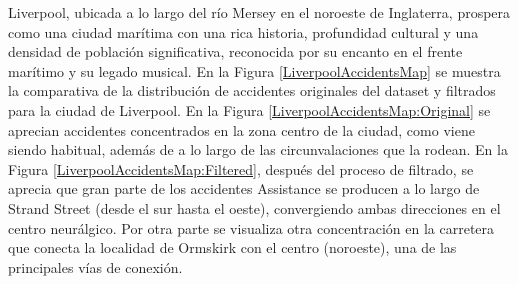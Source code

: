 \documentclass{uathesis-es}
\begin{document}
Liverpool, ubicada a lo largo del río Mersey en el noroeste de Inglaterra, prospera como una ciudad marítima con una rica historia, profundidad cultural y una densidad de población significativa, reconocida por su encanto en el frente marítimo y su legado musical. En la Figura \ref{LiverpoolAccidentsMap} se muestra la comparativa de la distribución de accidentes originales del dataset y filtrados para la ciudad de Liverpool. En la Figura \ref{LiverpoolAccidentsMap:Original} se aprecian accidentes concentrados en la zona centro de la ciudad, como viene siendo habitual, además de a lo largo de las circunvalaciones que la rodean. En la Figura \ref{LiverpoolAccidentsMap:Filtered}, después del proceso de filtrado, se aprecia que gran parte de los accidentes Assistance se producen a lo largo de Strand Street (desde el sur hasta el oeste), convergiendo ambas direcciones en el centro neurálgico. Por otra parte se visualiza otra concentración en la carretera que conecta la localidad de Ormskirk con el centro (noroeste), una de las principales vías de conexión.
\end{document}
